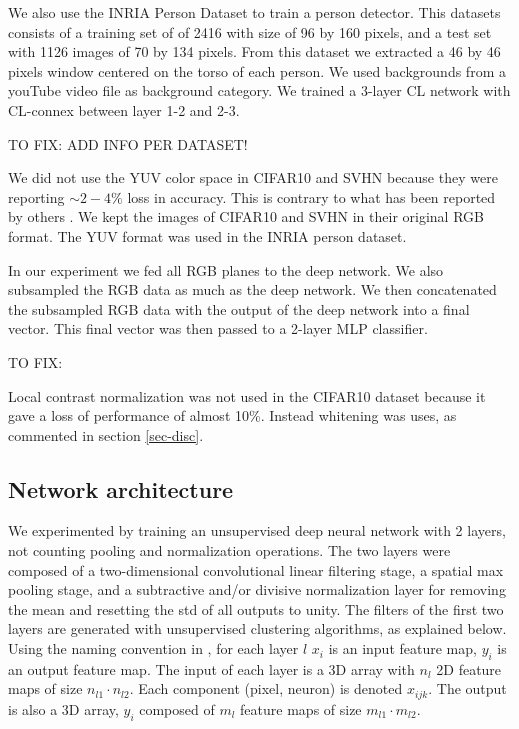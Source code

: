 \documentclass{article} %
\begin{document}
We also use the INRIA Person Dataset \cite{INRIAperson} to train a person detector. This datasets consists of a training set of of 2416 with size of 96 by 160 pixels, and a test set with 1126 images of 70 by 134 pixels. From this dataset we extracted a 46 by 46 pixels window centered on the torso of each person. We used backgrounds from a youTube video file as background category.
We trained a 3-layer CL network with CL-connex between layer 1-2 and 2-3.

TO FIX: ADD INFO PER DATASET!

We did not use the YUV color space in CIFAR10 and SVHN because they were reporting $\sim 2-4\%$ loss in accuracy. This is contrary to what has been reported by others \cite{jarrett_what_2009}. We kept the images of CIFAR10 and SVHN in their original RGB format. The YUV format was used in the INRIA person dataset.

In our experiment we fed all RGB planes to the deep network. We also subsampled the RGB data as much as the deep network. We then concatenated the subsampled RGB data with the output of the deep network into a final vector. This final vector was then passed to a 2-layer MLP classifier. 

TO FIX:

Local contrast normalization was not used in the CIFAR10 dataset because it gave a loss of performance of almost 10\%. Instead whitening was uses, as commented in section \ref{sec-disc}.




\subsection{Network architecture}
\label{sec-net-arch}

We experimented by training an unsupervised deep neural network with 2 layers, not counting pooling and normalization operations. The two layers were composed of a two-dimensional convolutional linear filtering stage, a spatial max pooling stage, and a subtractive and/or divisive normalization layer for removing the mean and resetting the std of all outputs to unity. 
The filters of the first two layers are generated with unsupervised clustering algorithms, as explained below. 
Using the naming convention in \cite{lecun_convolutional_2010}, for each layer $l$  $x_i$ is an input feature map, $y_i$ is an output feature map. The input of each layer is a 3D array with $n_l$ 2D feature maps of size $n_{l1} \cdot n_{l2}$. Each component (pixel, neuron) is denoted $x_{ijk}$. The output is also a 3D array, $y_i$ composed of $m_l$ feature maps of size $m_{l1} \cdot m_{l2}$.
\end{document}
